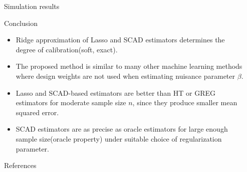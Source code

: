 \documentclass[final]{beamer}
\newlength{\sepwidth}
\newlength{\colwidth}
\newcommand{\separatorcolumn}{\begin{column}{\sepwidth}\end{column}}
\begin{document}
\begin{frame}[t]
\begin{columns}[t]
\begin{column}{\colwidth}
\begin{block}{Simulation results}
  \end{block}

  \begin{block}{Conclusion}

    \begin{itemize}
        \item Ridge approximation of Lasso and SCAD estimators determines the degree of calibration(soft, exact).
        \item The proposed method is similar to many other machine learning methods where design weights are not used when estimating nuisance parameter $\beta$.
        \item Lasso and SCAD-based estimators are better than HT or GREG estimators for moderate sample size $n$, since they produce smaller mean squared error.
        \item SCAD estimators are as precise as oracle estimators for large enough sample size(oracle property) under suitable choice of regularization parameter.
    \end{itemize}

  \end{block}

  \begin{block}{References}
    \nocite{park2008ridge}
    \nocite{mcconville2017model}
    \nocite{goga2010overview}
    \footnotesize{}

  \end{block}

\end{column}

\separatorcolumn
\end{columns}
\end{frame}
\end{document}
